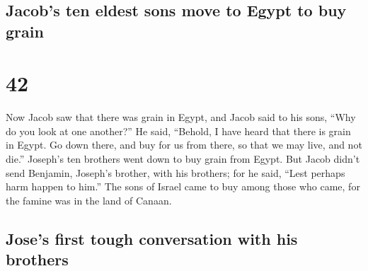 \begin{paracol}{2}
\switchcolumn
\begin{otherlanguage}{english}

\hypertarget{jacobs-ten-eldest-sons-move-to-egypt-to-buy-grain}{%
\subsection{Jacob's ten eldest sons move to Egypt to buy
grain}\label{jacobs-ten-eldest-sons-move-to-egypt-to-buy-grain}}

\hypertarget{section-83}{%
\section{42}\label{section-83}}

 Now Jacob saw that there was grain in Egypt, and Jacob
said to his sons, ``Why do you look at one another?''  He
said, ``Behold, I have heard that there is grain in Egypt. Go down
there, and buy for us from there, so that we may live, and not die.''
 Joseph's ten brothers went down to buy grain from Egypt.
 But Jacob didn't send Benjamin, Joseph's brother, with
his brothers; for he said, ``Lest perhaps harm happen to him.''
 The sons of Israel came to buy among those who came, for
the famine was in the land of Canaan.

\hypertarget{joses-first-tough-conversation-with-his-brothers}{%
\subsection{Jose's first tough conversation with his
brothers}\label{joses-first-tough-conversation-with-his-brothers}}


\end{otherlanguage}
\end{paracol}
